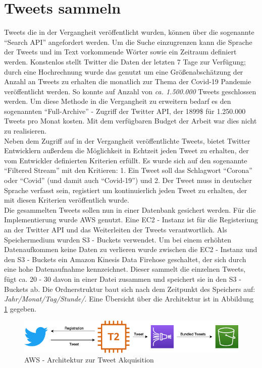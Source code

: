 \section{Tweets sammeln}
Tweets die in der Vergangheit veröffentlicht wurden, können über die sogenannte "`Search API"' angefordert werden. Um die Suche einzugrenzen kann die Sprache der Tweets und im Text vorkommende Wörter sowie ein Zeitraum definiert werden. 
Konstenlos stellt Twitter die Daten der letzten 7 Tage zur Verfügung; durch eine Hochrechnung wurde das genutzt um eine Größenabschätzung der Anzahl an Tweets zu erhalten die monatlich zur Thema der Covid-19 Pandemie veröffentlicht werden.
So konnte auf Anzahl von \textit{ca. 1.500.000} Tweets geschlossen werden. 
Um diese Methode in die Vergangheit zu erweitern bedarf es den sogenannten "`Full-Archive"' - Zugriff der Twitter API, der 1899\$ für 1.250.000 Tweets pro Monat kosten. Mit dem verfügbaren Budget der Arbeit war dies nicht zu realisieren.\\ \newline
Neben dem Zugriff auf in der Vergangheit veröffentlichte Tweets, bietet Twitter Entwicklern außerdem die Möglichkeit in Echtzeit jeden Tweet zu erhalten, der vom Entwickler definierten Kriterien erfüllt. 
Es wurde sich auf den sogenannte "`Filtered Stream"' mit den Kritieren: 1. Ein Tweet soll das Schlagwort "`Corona"' oder "`Covid"' (und damit auch "`Covid-19"') und 2. Der Tweet muss in deutscher Sprache verfasst sein, registiert um kontinuierlich jeden Tweet zu erhalten, der mit diesen Kriterien veröffentlich wurde. \\
Die gesammelten Tweets sollen nun in einer Datenbank gesichert werden. 
Für die Implementierung wurde \ac{AWS}  genutzt. Eine \gls{EC2 - Instanz} ist für die Registeriung an der Twitter API und das Weiterleiten der Tweets verantwortlich. Als Speichermedium wurden \glspl{S3 - Bucket} verwendet. Um bei einem erhöhten Datenaufkommen keine Daten zu verlieren wurde zwischen die \gls{EC2 - Instanz} und den \glspl{S3 - Bucket} ein \gls{Amazon Kinesis Data Firehose} geschaltet, der sich durch eine hohe Datenaufnahme kennzeichnet. 
Dieser sammelt die einzelnen Tweets, fügt ca. 20 - 30 davon in einer Datei zusammen und speichert sie in den \glspl{S3 - Bucket} ab. 
Die Ordnerstruktur baut sich nach dem Zeitpunkt des Speichers auf: \textit{Jahr/Monat/Tag/Stunde/}.
Eine Übersicht über die Architektur ist in Abbildung \ref{fig:aws-architecture} gegeben.
\begin{figure}[h]
	\centering
	\includegraphics[width=0.7\linewidth]{images/AWS-architecture}
	\caption[]{\ac{AWS} - Architektur zur Tweet Akquisition}
	\label{fig:aws-architecture}
\end{figure}

